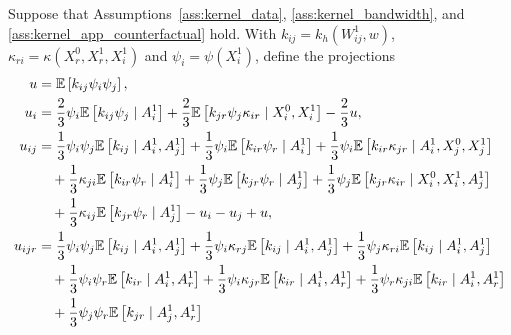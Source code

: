 \begin{lemma}
  \label{lem:kernel_app_counterfactual_hoeffding}

  Suppose that Assumptions~\ref{ass:kernel_data},
  \ref{ass:kernel_bandwidth}, and
  \ref{ass:kernel_app_counterfactual} hold.
  With $k_{i j} = k_h(W_{i j}^1, w)$,
  $\kappa_{r i} = \kappa(X_r^0, X_r^1, X_i^1)$
  and $\psi_i = \psi(X_i^1)$, define the projections
  \begin{align*}
    u
    &=
    \E\left[
      k_{i j}
      \psi_i
      \psi_j
    \right], \\
    u_i
    &=
    \frac{2}{3} \psi_i
    \E\left[
      k_{i j}
      \psi_j
    \mid A_i^1 \right]
    +
    \frac{2}{3} \E\left[
      k_{jr}
      \psi_j \kappa_{i r}
    \mid X_i^0, X_i^1 \right]
    - \frac{2}{3} u, \\
    u_{i j}
    &=
    \frac{1}{3}
    \psi_i
    \psi_j
    \E\left[
      k_{i j}
    \mid A_i^1, A_j^1 \right]
    +
    \frac{1}{3}
    \psi_i
    \E\left[
      k_{i r} \psi_r
    \mid A_i^1 \right]
    +
    \frac{1}{3}
    \psi_i
    \E\left[
      k_{i r}  \kappa_{jr}
    \mid A_i^1, X_j^0, X_j^1 \right] \\
    &\quad+
    \frac{1}{3}
    \kappa_{j i}
    \E\left[
      k_{i r} \psi_r
    \mid A_i^1 \right]
    + \frac{1}{3}
    \psi_j
    \E\left[
      k_{jr}  \psi_r
    \mid A_j^1 \right]
    +
    \frac{1}{3}
    \psi_j
    \E\left[
      k_{jr}  \kappa_{i r}
    \mid X_i^0, X_i^1, A_j^1 \right] \\
    &\quad+
    \frac{1}{3}
    \kappa_{i j}
    \E\left[
      k_{jr} \psi_r
    \mid A_j^1 \right]
    - u_i - u_j + u, \\
    u_{i j r}
    &=
    \frac{1}{3}
    \psi_i \psi_j
    \E\left[
      k_{i j}
    \mid A_i^1, A_j^1 \right]
    +
    \frac{1}{3}
    \psi_i \kappa_{r j}
    \E\left[
      k_{i j}
    \mid A_i^1, A_j^1 \right]
    +
    \frac{1}{3}
    \psi_j \kappa_{r i}
    \E\left[
      k_{i j}
    \mid A_i^1, A_j^1 \right] \\
    &\quad+
    \frac{1}{3}
    \psi_i \psi_r
    \E\left[
      k_{i r}
    \mid A_i^1, A_r^1 \right]
    + \frac{1}{3}
    \psi_i \kappa_{jr}
    \E\left[
      k_{i r}
    \mid A_i^1, A_r^1 \right]
    +
    \frac{1}{3}
    \psi_r \kappa_{j i}
    \E\left[
      k_{i r}
    \mid A_i^1, A_r^1 \right] \\
    &\quad+
    \frac{1}{3}
    \psi_j \psi_r
    \E\left[
      k_{jr}
    \mid A_j^1, A_r^1 \right]

\end{align*}
\end{lemma}
